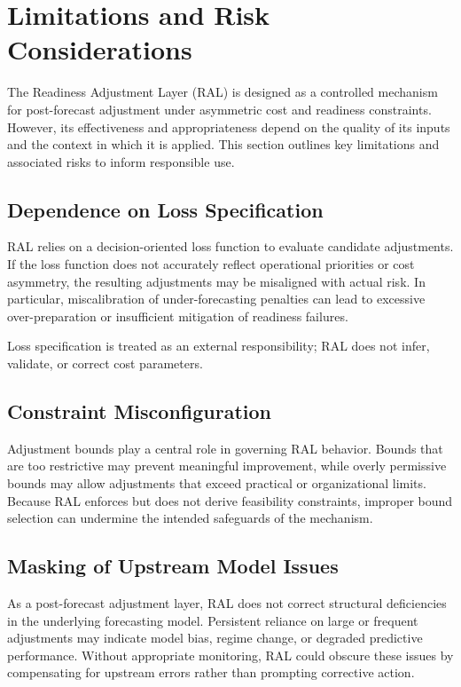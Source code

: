 \section{Limitations and Risk Considerations}

The Readiness Adjustment Layer (RAL) is designed as a controlled mechanism for
post-forecast adjustment under asymmetric cost and readiness constraints.
However, its effectiveness and appropriateness depend on the quality of its
inputs and the context in which it is applied. This section outlines key
limitations and associated risks to inform responsible use.

\subsection{Dependence on Loss Specification}

RAL relies on a decision-oriented loss function to evaluate candidate adjustments.
If the loss function does not accurately reflect operational priorities or cost
asymmetry, the resulting adjustments may be misaligned with actual risk. In
particular, miscalibration of under-forecasting penalties can lead to excessive
over-preparation or insufficient mitigation of readiness failures.

Loss specification is treated as an external responsibility; RAL does not infer,
validate, or correct cost parameters.

\subsection{Constraint Misconfiguration}

Adjustment bounds play a central role in governing RAL behavior. Bounds that are
too restrictive may prevent meaningful improvement, while overly permissive
bounds may allow adjustments that exceed practical or organizational limits.
Because RAL enforces but does not derive feasibility constraints, improper bound
selection can undermine the intended safeguards of the mechanism.

\subsection{Masking of Upstream Model Issues}

As a post-forecast adjustment layer, RAL does not correct structural deficiencies
in the underlying forecasting model. Persistent reliance on large or frequent
adjustments may indicate model bias, regime change, or degraded predictive
performance. Without appropriate monitoring, RAL could obscure these issues by
compensating for upstream errors rather than prompting corrective action.

